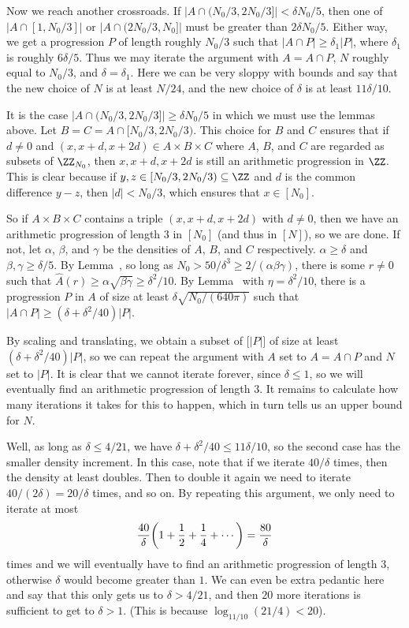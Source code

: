 Now we reach another crossroads. If $\bigl| A\cap (N_0/3, 2N_0/3]\bigr| < \delta N_0/5$, then one of
$\bigl| A\cap [1,N_0/3]\bigr|$ or $\bigl| A\cap (2N_0/3,N_0]\bigr|$ must be greater than $2\delta N_0 / 5$.
Either way, we get a progression $P$ of length roughly $N_0/3$ such that $|A\cap P| \ge \delta_1|P|$,
where $\delta_1$ is roughly $6\delta/5$. Thus we may iterate the argument with $A = A\cap P$, $N$
roughly equal to $N_0/3$, and $\delta = \delta_1$. Here we can be very sloppy with bounds and say that
the new choice of $N$ is at least $N/24$, and the new choice of $\delta$ is at least $11\delta/10$.

It is the case $\bigl| A\cap (N_0/3, 2N_0/3]\bigr| \ge \delta N_0/5$ in which we must use the lemmas
above. Let $B = C = A\cap [N_0/3, 2N_0/3)$. This choice for $B$ and $C$ ensures that if $d\ne 0$ and
$(x,x+d,x+2d)\in A\times B\times C$ where $A$, $B$, and $C$ are regarded as subsets of $\ZZ_{N_0}$, then
$x,x+d,x+2d$ is still an arithmetic progression in $\ZZ$. This is clear because if
$y,z\in [N_0/3,2N_0/3)\subseteq \ZZ$ and $d$ is the common difference $y-z$, then $|d| < N_0/3$, which
ensures that $x\in [N_0]$.

So if $A\times B\times C$ contains a triple $(x,x+d,x+2d)$ with $d\ne 0$, then we have an arithmetic
progression of length $3$ in $[N_0]$ (and thus in $[N]$), so we are done. If not,
let $\alpha$, $\beta$, and $\gamma$ be the densities of $A$, $B$, and $C$ respectively.
$\alpha \ge \delta$ and $\beta,\gamma\ge \delta/5$. By Lemma~{\lemABC}, so long as
$N_0 > 50/\delta^3 \ge 2/(\alpha\beta\gamma)$, there is some $r\ne 0$ such that
$\hat A(r) \ge \alpha\sqrt{\beta\gamma} \ge \delta^2/10$. By Lemma~{\lemdensityincrement} with
$\eta = \delta^2/10$, there is a progression $P$ in $A$ of size at least $\delta \sqrt{N_0/(640\pi)}$
such that $|A\cap P| \ge (\delta + \delta^2/40)|P|$.

By scaling and translating, we obtain a subset of $\bigl[|P|\bigr]$ of size at least $(\delta+\delta^2/40)|P|$,
so we can repeat the argument with $A$ set to $A = A\cap P$ and $N$ set to $|P|$. It is clear that
we cannot iterate forever, since $\delta \le 1$, so we will eventually find an arithmetic progression
of length $3$. It remains to calculate how many iterations it takes for this to happen, which in turn tells
us an upper bound for $N$.

Well, as long as $\delta \le 4/21$, we have $\delta + \delta^2/40 \le 11\delta/10$, so the
second case has the smaller density increment. In this case, note that if we iterate $40/\delta$ times,
then the density at least doubles. Then to double it again we need to iterate $40/(2\delta) = 20/\delta$
times, and so on. By repeating this argument, we only need to iterate at most
$$ {40\over\delta} \biggl(1 + {1\over 2} + {1\over 4} + \cdots \biggr) = {80\over \delta}$$
times and we will eventually have to find an arithmetic progression of length $3$, otherwise $\delta$ would
become greater than $1$. We can even be extra pedantic here and say that this only gets us to $\delta >4/21$,
and then $20$ more iterations is sufficient to get to $\delta > 1$. (This is because $\log_{11/10}(21/4) < 20$).

